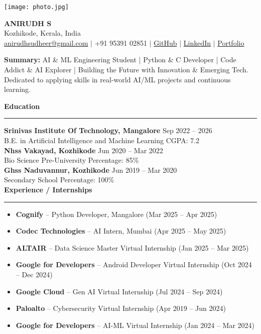 \documentclass[a4paper]{article}
\newcommand{\resumesection}[1]{\vspace{8pt}\textbf{\large\color{blue}#1}\vspace{2pt}\hrule\vspace{4pt}}
\newenvironment{resumebullets}{\begin{itemize}[leftmargin=*,itemsep=2pt,topsep=2pt]}{\end{itemize}}
\newcommand{\resumecontact}[3]{
  \begin{center}
    {\Huge\bfseries #1}\\
    #2 \\ #3
  \end{center}
}
\begin{document}
\vspace*{-30pt}


\begin{minipage}{0.22\textwidth}
  \texttt{[image: photo.jpg]} %
\end{minipage}
\hfill
\begin{minipage}{0.75\textwidth}
  \resumecontact{ANIRUDH S}{Kozhikode, Kerala, India}{\href{mailto:anirudhsudheer@gmail.com}{anirudhsudheer@gmail.com} $\vert$ +91 95391 02851 $\vert$ \href{https://github.com/SudoAnirudh}{GitHub} $\vert$ \href{https://www.linkedin.com/in/sudoanirudh/}{LinkedIn} $\vert$ \href{http://bit.ly/3Du0xXP}{Portfolio}}
\vspace{2pt}
  \noindent\textbf{Summary:} AI \& ML Engineering Student | Python \& C Developer | Code Addict \& AI Explorer | Building the Future with Innovation \& Emerging Tech. Dedicated to applying skills in real-world AI/ML projects and continuous learning.
\end{minipage}

\resumesection{Education}
\textbf{Srinivas Institute Of Technology, Mangalore} \hfill Sep 2022 -- 2026\\
B.E. in Artificial Intelligence and Machine Learning \hfill CGPA: 7.2\\
\textbf{Nhss Vakayad, Kozhikode} \hfill Jun 2020 -- Mar 2022\\
Bio Science Pre-University \hfill Percentage: 85\%\\
\textbf{Ghss Naduvannur, Kozhikode} \hfill Jun 2019 -- Mar 2020\\
Secondary School \hfill Percentage: 100\%\\

\resumesection{Experience / Internships}
\begin{resumebullets}
  \item \textbf{Cognify} -- Python Developer, Mangalore (Mar 2025 -- Apr 2025)
  \item \textbf{Codec Technologies} -- AI Intern, Mumbai (Apr 2025 -- May 2025)
  \item \textbf{ALTAIR} -- Data Science Master Virtual Internship (Jan 2025 -- Mar 2025)
  \item \textbf{Google for Developers} -- Android Developer Virtual Internship (Oct 2024 -- Dec 2024)
  \item \textbf{Google Cloud} -- Gen AI Virtual Internship (Jul 2024 -- Sep 2024)
  \item \textbf{Paloalto} -- Cybersecurity Virtual Internship (Apr 2019 -- Jun 2024)
  \item \textbf{Google for Developers} -- AI-ML Virtual Internship (Jan 2024 -- Mar 2024)
\end{resumebullets}
\end{document}

